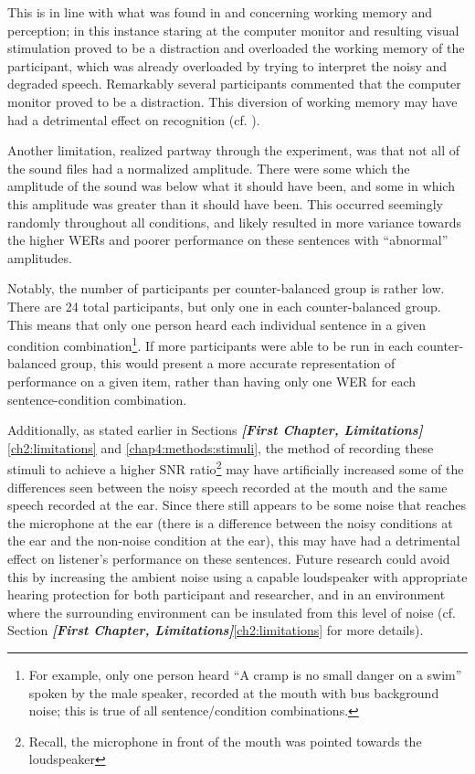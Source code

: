 \documentclass[dissertation,copyright]{uathesis}
\begin{document}
This is in line with what was found in \cite{francis:09} and \cite{francis:10} concerning working memory and perception; in this instance staring at the computer monitor and resulting visual stimulation proved to be a distraction and overloaded the working memory of the participant, which was already overloaded by trying to interpret the noisy and degraded speech.  Remarkably several participants commented that the computer monitor proved to be a distraction.  This diversion of working memory may have had a detrimental effect on recognition (cf. \cite{caplan:99}).

Another limitation, realized partway through the experiment, was that not all of the sound files had a normalized amplitude.  There were some which the amplitude of the sound was below what it should have been, and some in which this amplitude was greater than it should have been.  This occurred seemingly randomly throughout all conditions, and likely resulted in more variance towards the higher WERs and poorer performance on these sentences with ``abnormal'' amplitudes.

Notably, the number of participants per counter-balanced group is rather low.  There are 24 total participants, but only one in each counter-balanced group.  This means that only one person heard each individual sentence in a given condition combination\footnote{For example, only one person heard ``A cramp is no small danger on a swim'' spoken by the male speaker, recorded at the mouth with bus background noise; this is true of all sentence/condition combinations.}.  If more participants were able to be run in each counter-balanced group, this would present a more accurate representation of performance on a given item, rather than having only one WER for each sentence-condition combination.

Additionally, as stated earlier in Sections \textit{\textbf{[First Chapter, Limitations]}}\ref{ch2:limitations} and \ref{chap4:methods:stimuli}, the method of recording these stimuli to achieve a higher SNR ratio\footnote{Recall, the microphone in front of the mouth was pointed towards the loudspeaker} may have artificially increased some of the differences seen between the noisy speech recorded at the mouth and the same speech recorded at the ear.  Since there still appears to be some noise that reaches the microphone at the ear (there is a difference between the noisy conditions at the ear and the non-noise condition at the ear), this may have had a detrimental effect on listener's performance on these sentences.  Future research could avoid this by increasing the ambient noise using a capable loudspeaker with appropriate hearing protection for both participant and researcher, and in an environment where the surrounding environment can be insulated from this level of noise (cf. Section \textit{\textbf{[First Chapter, Limitations]}}\ref{ch2:limitations} for more details).
\end{document}
